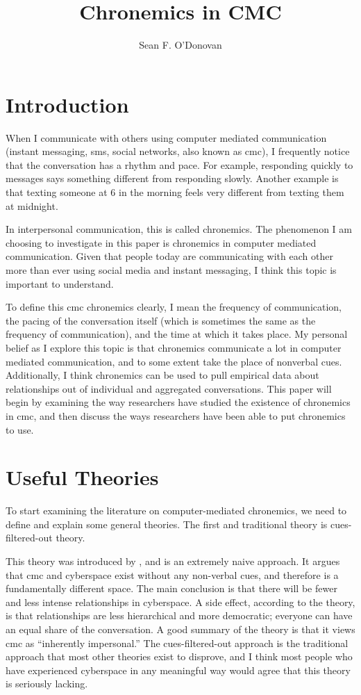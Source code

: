 \documentclass[
  stu]{apa7}
\affiliation{Brian Lamb School of Communication}
\title{Chronemics in CMC}
\author{Sean F. O'Donovan}
\date{}
\begin{document}
\maketitle

\hypertarget{introduction}{%
\section{Introduction}\label{introduction}}

When I communicate with others using computer mediated communication
(instant messaging, sms, social networks, also known as cmc), I
frequently notice that the conversation has a rhythm and pace. For
example, responding quickly to messages says something different from
responding slowly. Another example is that texting someone at 6 in the
morning feels very different from texting them at midnight.

In interpersonal communication, this is called chronemics. The
phenomenon I am choosing to investigate in this paper is chronemics in
computer mediated communication. Given that people today are
communicating with each other more than ever using social media and
instant messaging, I think this topic is important to understand.

To define this cmc chronemics clearly, I mean the frequency of
communication, the pacing of the conversation itself (which is sometimes
the same as the frequency of communication), and the time at which it
takes place. My personal belief as I explore this topic is that
chronemics communicate a lot in computer mediated communication, and to
some extent take the place of nonverbal cues. Additionally, I think
chronemics can be used to pull empirical data about relationships out of
individual and aggregated conversations. This paper will begin by
examining the way researchers have studied the existence of chronemics
in cmc, and then discuss the ways researchers have been able to put
chronemics to use.

\hypertarget{useful-theories}{%
\section{Useful Theories}\label{useful-theories}}

To start examining the literature on computer-mediated chronemics, we
need to define and explain some general theories. The first and
traditional theory is cues-filtered-out theory.

This theory was introduced by \textcite{sproull91}, and is an extremely
naive approach. It argues that cmc and cyberspace exist without any
non-verbal cues, and therefore is a fundamentally different space. The
main conclusion is that there will be fewer and less intense
relationships in cyberspace. A side effect, according to the theory, is
that relationships are less hierarchical and more democratic; everyone
can have an equal share of the conversation. A good summary of the
theory is that it views cmc as ``inherently impersonal.'' The
cues-filtered-out approach is the traditional approach that most other
theories exist to disprove, and I think most people who have experienced
cyberspace in any meaningful way would agree that this theory is
seriously lacking.
\end{document}
